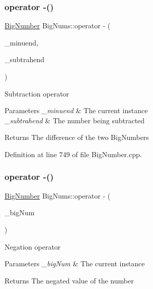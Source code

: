 \subsubsection{\texorpdfstring{operator -\/()}{operator -()}\hspace{0.1cm}{\footnotesize\ttfamily [1/2]}}
{\footnotesize\ttfamily \mbox{\hyperlink{class_big_nums_1_1_big_number}{Big\+Number}} Big\+Nums\+::operator -\/ (\begin{DoxyParamCaption}\item[{\mbox{\hyperlink{class_big_nums_1_1_big_number}{Big\+Number}}}]{\+\_\+minuend,  }\item[{const \mbox{\hyperlink{class_big_nums_1_1_big_number}{Big\+Number}} \&}]{\+\_\+subtrahend }\end{DoxyParamCaption})}

Subtraction operator 
\begin{DoxyParams}{Parameters}
{\em \+\_\+minuend} & The current instance \\
\hline
{\em \+\_\+subtrahend} & The number being subtracted \\
\hline
\end{DoxyParams}
\begin{DoxyReturn}{Returns}
The difference of the two Big\+Numbers 
\end{DoxyReturn}


Definition at line 749 of file Big\+Number.\+cpp.

\mbox{\label{namespace_big_nums_afc1c2c149134a0b2a64347c14d96946d}} 
\subsubsection{\texorpdfstring{operator -\/()}{operator -()}\hspace{0.1cm}{\footnotesize\ttfamily [2/2]}}
{\footnotesize\ttfamily \mbox{\hyperlink{class_big_nums_1_1_big_number}{Big\+Number}} Big\+Nums\+::operator -\/ (\begin{DoxyParamCaption}\item[{const \mbox{\hyperlink{class_big_nums_1_1_big_number}{Big\+Number}} \&}]{\+\_\+big\+Num }\end{DoxyParamCaption})}

Negation operator 
\begin{DoxyParams}{Parameters}
{\em \+\_\+big\+Num} & The current instance \\
\hline
\end{DoxyParams}
\begin{DoxyReturn}{Returns}
The negated value of the number 
\end{DoxyReturn}


